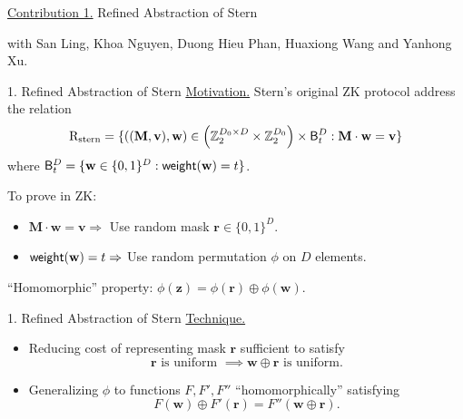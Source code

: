\begin{frame}{}
	\underline{Contribution 1.} Refined Abstraction of Stern
	
	with San Ling, Khoa Nguyen, Duong Hieu Phan, Huaxiong Wang and Yanhong Xu.
\end{frame}

\begin{frame}{1. Refined Abstraction of Stern}
	\underline{Motivation.} Stern's original ZK protocol address the relation 
	\begin{equation*}
		\mathrm{R}_{\mathrm{stern}} = \{((\mathbf{M},\mathbf{v}), \mathbf{w}) \in \left(\mathbb{Z}_2^{D_0\times D}\times \mathbb{Z}_2^{D_0}\right)\times \mathsf{B}^D_t : \mathbf{M}\cdot\mathbf{w} = \mathbf{v}\}
	\end{equation*}
	where $\mathsf{B}^D_t = \{\mathbf{w} \in \{0,1\}^D : \mathsf{weight}(\mathbf{w}) = t\}$.
	
	To prove in ZK:
	\begin{itemize}
			\item $\mathbf{M}\cdot\mathbf{w} =\mathbf{v} \Rightarrow$ Use random mask $\mathbf{r} \in \{0,1\}^D$.
			\item $\mathsf{weight}(\mathbf{w}) = t \Rightarrow$ Use random permutation $\phi$ on $D$ elements.
	\end{itemize}
	
	``Homomorphic'' property: $\phi(\mathbf{z}) = \phi(\mathbf{r}) \oplus \phi(\mathbf{w})$.
\end{frame}

\begin{frame}{1. Refined Abstraction of Stern}
	\underline{Technique.}
	\begin{itemize}
		\item Reducing cost of representing mask $\mathbf{r}$ sufficient to satisfy 
		\begin{equation*}
			\mathbf{r} \text{ is uniform } \implies \mathbf{w} \oplus \mathbf{r} \text{ is uniform.}
		\end{equation*}  
		\item Generalizing $\phi$ to functions $F, F', F''$ ``homomorphically'' satisfying
		\begin{equation*}
			F(\mathbf{w}) \oplus F'(\mathbf{r}) = F''(\mathbf{w} \oplus \mathbf{r}).
		\end{equation*}
	\end{itemize}
\end{frame}